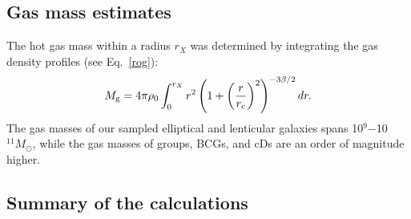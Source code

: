 \documentclass[iop]{emulateapj}
\begin{document}
\subsection{Gas mass estimates}
The hot gas mass within a radius $r_X$ was determined by integrating the gas density profiles (see Eq.~\ref{rog}): 
\begin{equation}
M_{\rm g} = 4\pi \rho_{0} \int_{0}^{r_X} r^{2} \left( 1 + \left( \frac{r}{r_{c}}\right)^{2}\right)^{-3\beta/2} dr.
\label{mg1}
\end{equation}
The gas masses of our sampled elliptical and lenticular galaxies spans 10$^{9}$$-$10$^{11} M_{\odot}$, while the gas masses of groups, BCGs, and cDs are an order of magnitude higher.

\subsection{Summary of the calculations}
\end{document}
